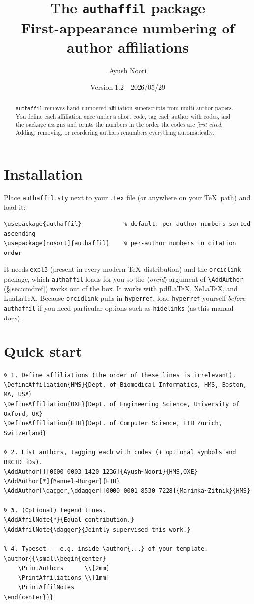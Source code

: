 \documentclass[11pt]{article}
\title{\textbf{The \texttt{authaffil} package}\\[2pt]
  \large First-appearance numbering of author affiliations}
\author{Ayush Noori}
\date{Version 1.2 \,\textperiodcentered\, 2026/05/29}
\newcommand{\cs}[1]{\texttt{\textbackslash #1}}
\newcommand{\meta}[1]{$\langle$\textit{#1}$\rangle$}
\begin{document}
\maketitle
\thispagestyle{empty}

\begin{abstract}
\noindent\texttt{authaffil} removes hand-numbered affiliation superscripts from
multi-author papers. You define each affiliation once under a short code, tag
each author with codes, and the package assigns and prints the numbers in the
order the codes are \emph{first cited}. Adding, removing, or reordering authors
renumbers everything automatically.
\end{abstract}

\section{Installation}
Place \texttt{authaffil.sty} next to your \texttt{.tex} file (or anywhere on
your \TeX\ path) and load it:
\begin{lstlisting}
\usepackage{authaffil}            % default: per-author numbers sorted ascending
\usepackage[nosort]{authaffil}    % per-author numbers in citation order
\end{lstlisting}
It needs \texttt{expl3} (present in every modern \TeX\ distribution) and the
\texttt{orcidlink} package, which \texttt{authaffil} loads for you so the
\meta{orcid} argument of \cs{AddAuthor} (\S\ref{sec:cmdref}) works out of the
box. It works with pdf\LaTeX, Xe\LaTeX, and Lua\LaTeX. Because
\texttt{orcidlink} pulls in \texttt{hyperref}, load \texttt{hyperref} yourself
\emph{before} \texttt{authaffil} if you need particular options such as
\texttt{hidelinks} (as this manual does).

\section{Quick start}
\begin{lstlisting}
% 1. Define affiliations (the order of these lines is irrelevant).
\DefineAffiliation{HMS}{Dept. of Biomedical Informatics, HMS, Boston, MA, USA}
\DefineAffiliation{OXE}{Dept. of Engineering Science, University of Oxford, UK}
\DefineAffiliation{ETH}{Dept. of Computer Science, ETH Zurich, Switzerland}

% 2. List authors, tagging each with codes (+ optional symbols and ORCID iDs).
\AddAuthor[][0000-0003-1420-1236]{Ayush~Noori}{HMS,OXE}
\AddAuthor[*]{Manuel~Burger}{ETH}
\AddAuthor[\dagger,\ddagger][0000-0001-8530-7228]{Marinka~Zitnik}{HMS}

% 3. (Optional) legend lines.
\AddAffilNote{*}{Equal contribution.}
\AddAffilNote{\dagger}{Jointly supervised this work.}

% 4. Typeset -- e.g. inside \author{...} of your template.
\author{{\small\begin{center}
    \PrintAuthors      \\[2mm]
    \PrintAffiliations \\[1mm]
    \PrintAffilNotes
\end{center}}}
\end{lstlisting}
\end{document}
